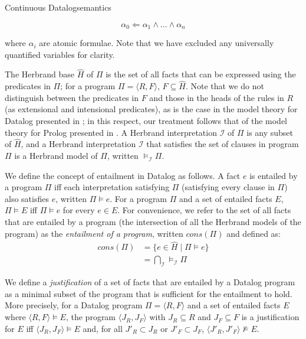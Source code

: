 \begin{nestedsection}{Continuous Datalog}{semantics}
\begin{definition}[Datalog]
\[ \alpha_0 \Leftarrow \alpha_1 \land \ldots \land \alpha_n \]

\noindent where $\alpha_i$ are atomic formulae. Note that we have excluded any
universally quantified variables for clarity.

The Herbrand base $\hat{H}$ of $\Pi$ is the set of all facts that can
be expressed using the predicates in $\Pi$; for a program $\Pi =
\langle R, F \rangle$, $F \subseteq \hat{H}$. Note that we do not
distinguish between the predicates in $F$ and those in the heads of
the rules in $R$ (as extensional and intensional predicates), as is
the case in the model theory for Datalog presented in
\cite{datalog-basics}; in this respect, our treatment follows that of
the model theory for Prolog presented in \cite{prolog-semantics}. A
Herbrand interpretation $\mathcal{I}$ of $\Pi$ is any subset of
$\hat{H}$, and a Herbrand interpretation $\mathcal{I}$ that satisfies
the set of clauses in program $\Pi$ is a Herbrand model of $\Pi$,
written $\models_{\mathcal{I}} \Pi$.

We define the concept of entailment in Datalog as follows. A fact $e$
is entailed by a program $\Pi$ iff each interpretation satisfying
$\Pi$ (satisfying every clause in $\Pi$) also satisfies $e$, written
$\Pi \models e$. For a program $\Pi$ and a set of entailed facts
$E$, $\Pi \models E$ iff $\Pi \models e$ for every $e \in E$. For
convenience, we refer to the set of all facts that are entailed by a
program (the intersection of all the Herbrand models of the program)
as the {\em entailment of a program}, written $cons(\Pi)$ and defined
as:
\begin{align*}
  cons(\Pi) &= \{ e \in \hat{H} \mid \Pi \models e \} \\
  &= \bigcap_\mathcal{I} \models_\mathcal{I} \Pi
\end{align*}
\end{definition}

\begin{definition}[Justification]

We define a {\em justification} of a set of facts that are entailed by
a Datalog program as a minimal subset of the program that is
sufficient for the entailment to hold. More precisely, for a Datalog
program $\Pi = \langle R, F \rangle$ and a set of entailed facts $E$
where $\langle R, F \rangle \models E$, the program $\langle J_R, J_F
\rangle$ with $J_R \subseteq R$ and $J_F \subseteq F$ is a
justification for $E$ iff $\langle J_R, J_F \rangle \models E$ and,
for all $J'_R \subset J_R$ or $J'_F \subset J_F$, $\langle J'_R, J'_F
\rangle \not\models E$.


\end{definition}
\end{nestedsection}
